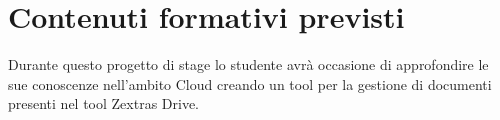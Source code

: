 \section*{Contenuti formativi previsti}
Durante questo progetto di stage lo studente avrà occasione di approfondire le sue conoscenze nell’ambito
Cloud creando un tool per la gestione di documenti presenti nel tool Zextras Drive. 
\newpage